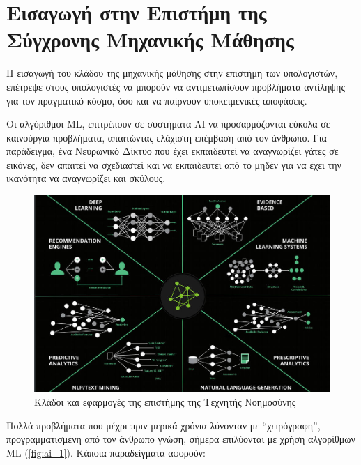 \section{Εισαγωγή στην Επιστήμη της Σύγχρονης Μηχανικής Μάθησης}
\label{sec:theory_ml}

Η εισαγωγή του κλάδου της μηχανικής μάθησης στην επιστήμη των υπολογιστών,
επέτρεψε στους υπολογιστές να μπορούν να αντιμετωπίσουν προβλήματα αντίληψης
για τον πραγματικό κόσμο, όσο και να παίρνουν υποκειμενικές αποφάσεις.

Οι αλγόριθμοι ML, επιτρέπουν σε συστήματα AI
να προσαρμόζονται εύκολα σε καινούργια προβλήματα, απαιτώντας ελάχιστη επέμβαση από τον άνθρωπο.
Για παράδειγμα, ένα Νευρωνικό Δίκτυο που έχει εκπαιδευτεί να αναγνωρίζει γάτες σε εικόνες,
δεν απαιτεί να σχεδιαστεί και να εκπαιδευτεί από το μηδέν για να έχει την ικανότητα
να αναγνωρίζει και σκύλους.

\begin{figure}[!ht]
  \centering
  \includegraphics[width=1\textwidth]{./images/chapter3/AI_1.jpg}
  \caption[Κλάδοι και εφαρμογές της επιστήμης της Τεχνητής Νοημοσύνης]{Κλάδοι και εφαρμογές της επιστήμης της Τεχνητής Νοημοσύνης}
  \label{fig:ai_1}
\end{figure}

Πολλά προβλήματα που μέχρι πριν μερικά χρόνια λύνονταν με
“χειρόγραφη”, προγραμματισμένη από τον άνθρωπο γνώση, σήμερα επιλύονται με χρήση
αλγορίθμων ML (\autoref{fig:ai_1}). Κάποια παραδείγματα αφορούν:

